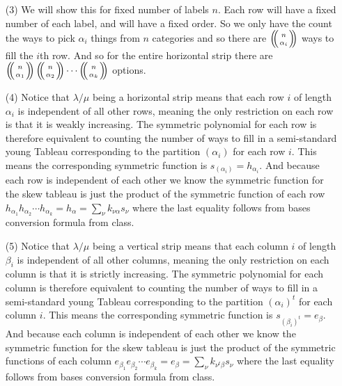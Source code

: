 \documentclass[12pt]{amsart}
\theoremstyle{definition}
\def\multiset#1#2{\ensuremath{\left(\kern-.3em\left(\genfrac{}{}{0pt}{}{#1}{#2}\right)\kern-.3em\right)}}
\begin{document}
\begin{itemize}
\item[(3)] %
We will show this for fixed number of labels $n$. Each row will have a fixed number of each label, and will have a fixed order. So we only have the count the ways to pick $\alpha_i$ things from $n$ categories and so there are $\multiset{n}{\alpha_i}$ ways to fill the $i$th row. And so for the entire horizontal strip there are $\multiset{n}{\alpha_1}\multiset{n}{\alpha_2}\cdots \multiset{n}{\alpha_k}$ options.\\

\item[(4)] %
Notice that $\lambda/\mu$ being a horizontal strip means that each row $i$ of length $\alpha_i$ is independent of all other rows, meaning the only restriction on each row is that it is weakly increasing. The symmetric polynomial for each row is therefore equivalent to counting the number of ways to fill in a semi-standard young Tableau corresponding to the partition $(\alpha_i)$ for each row $i$. This means the corresponding symmetric function is $s_{(\alpha_i)}=h_{\alpha_i}$. And because each row is independent of each other we know the symmetric function for the skew tableau is just the product of the symmetric function of each row $h_{\alpha_1}h_{\alpha_2}\cdots h_{\alpha_k}=h_\alpha=\sum_\nu k_{\nu \alpha}s_\nu$ where the last equality follows from bases conversion formula from class.\\

\item[(5)] %
Notice that $\lambda/\mu$ being a vertical strip means that each column $i$ of length $\beta_i$ is independent of all other columns, meaning the only restriction on each column is that it is strictly increasing. The symmetric polynomial for each column is therefore equivalent to counting the number of ways to fill in a semi-standard young Tableau corresponding to the partition $(\alpha_i)^t$ for each column $i$. This means the corresponding symmetric function is $s_{(\beta_i)^t}=e_{\beta}$. And because each column is independent of each other we know the symmetric function for the skew tableau is just the product of the symmetric functions of each column $e_{\beta_1}e_{\beta_2}\cdots e_{\beta_k}=e_\beta=\sum_\nu k_{\nu^t \beta} s_\nu$ where the last equality follows from bases conversion formula from class.\\


\end{itemize}
\end{document}
